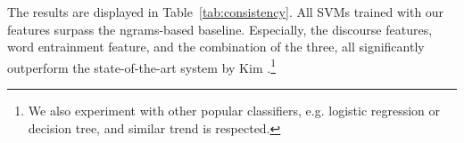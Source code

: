 The results are displayed in Table~\ref{tab:consistency}. All SVMs trained with our features surpass the ngrams-based baseline. Especially, the discourse features, word entrainment feature, and the combination of the three, all significantly outperform the state-of-the-art system by Kim \cite{kim2016improving}.\footnote{We also experiment with other popular classifiers, e.g. logistic regression or decision tree, and similar trend is respected.}


